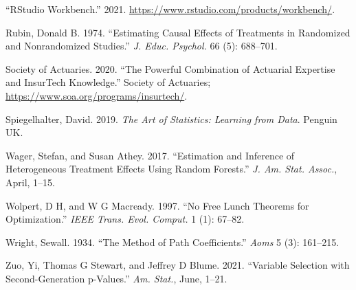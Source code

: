 \documentclass{article}
\newlength{\cslhangindent}
\newenvironment{CSLReferences}[2] %
 {%
  \setlength{\parindent}{0pt}
  \ifodd #1 \everypar{\setlength{\hangindent}{\cslhangindent}}\ignorespaces\fi
  \ifnum #2 > 0
  \setlength{\parskip}{#2\baselineskip}
  \fi
 }%
 {}
\begin{document}
\begin{CSLReferences}{1}{0}
\leavevmode{}%
{``{RStudio} Workbench.''} 2021.
\url{https://www.rstudio.com/products/workbench/}.

\leavevmode{}%
Rubin, Donald B. 1974. {``Estimating Causal Effects of Treatments in
Randomized and Nonrandomized Studies.''} \emph{J. Educ. Psychol.} 66
(5): 688--701.

\leavevmode{}%
Society of Actuaries. 2020. {``The Powerful Combination of Actuarial
Expertise and {InsurTech} Knowledge.''} Society of Actuaries;
\url{https://www.soa.org/programs/insurtech/}.

\leavevmode{}%
Spiegelhalter, David. 2019. \emph{The Art of Statistics: Learning from
Data}. Penguin UK.

\leavevmode{}%
Wager, Stefan, and Susan Athey. 2017. {``Estimation and Inference of
Heterogeneous Treatment Effects Using Random Forests.''} \emph{J. Am.
Stat. Assoc.}, April, 1--15.

\leavevmode{}%
Wolpert, D H, and W G Macready. 1997. {``No Free Lunch Theorems for
Optimization.''} \emph{IEEE Trans. Evol. Comput.} 1 (1): 67--82.

\leavevmode{}%
Wright, Sewall. 1934. {``The Method of Path Coefficients.''} \emph{Aoms}
5 (3): 161--215.

\leavevmode{}%
Zuo, Yi, Thomas G Stewart, and Jeffrey D Blume. 2021. {``Variable
Selection with Second-Generation p-Values.''} \emph{Am. Stat.}, June,
1--21.

\end{CSLReferences}



\end{document}
